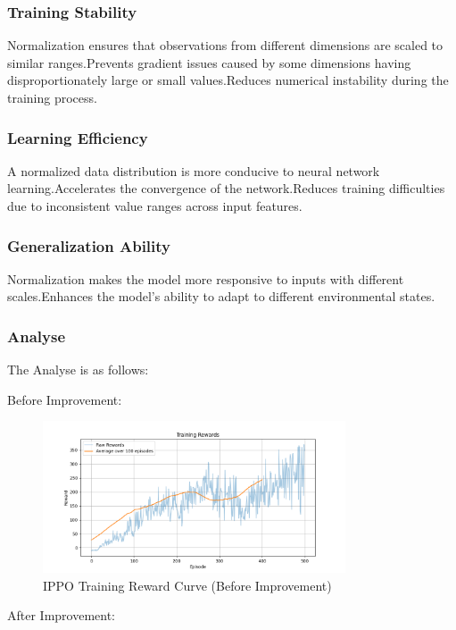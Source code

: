 \documentclass[12pt]{article}
\begin{document}
\subsubsection{Training Stability}

Normalization ensures that observations from different dimensions are scaled to similar ranges.Prevents gradient issues caused by some dimensions having disproportionately large or small values.Reduces numerical instability during the training process.

\subsubsection{Learning Efficiency}
A normalized data distribution is more conducive to neural network learning.Accelerates the convergence of the network.Reduces training difficulties due to inconsistent value ranges across input features.

\subsubsection{Generalization Ability}Normalization makes the model more responsive to inputs with different scales.Enhances the model's ability to adapt to different environmental states.

\subsubsection{Analyse}
The Analyse is as follows:

Before Improvement:

\begin{figure}[H]
    \centering
    \includegraphics[width=0.8\textwidth]{ippo_training_rewards.png}
    \caption{IPPO Training Reward Curve (Before Improvement)}
    \label{fig:ippo_rewards_before}
\end{figure}

After Improvement:
\end{document}
